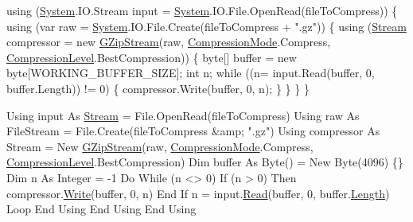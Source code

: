 \begin{DoxyCode}
\textcolor{keyword}{using} (\mbox{\hyperlink{namespace_system}{System}}.IO.Stream input = \mbox{\hyperlink{namespace_system}{System}}.IO.File.OpenRead(fileToCompress))
\{
    \textcolor{keyword}{using} (var raw = \mbox{\hyperlink{namespace_system}{System}}.IO.File.Create(fileToCompress + \textcolor{stringliteral}{".gz"}))
    \{
        \textcolor{keyword}{using} (\mbox{\hyperlink{namespace_super_tiled2_unity_1_1_ionic_1_1_zip_a9ced5352c56e7e0fceff15b534073c83aeae835e83c0494a376229f254f7d3392}{Stream}} compressor = \textcolor{keyword}{new} \mbox{\hyperlink{class_super_tiled2_unity_1_1_ionic_1_1_zlib_1_1_g_zip_stream_a509b4683754c1e03e277c5688b75cf54}{GZipStream}}(raw,
                                                  \mbox{\hyperlink{namespace_super_tiled2_unity_1_1_ionic_1_1_zlib_ad5b7635d92497e1c905e5de82eb1c6b1}{CompressionMode}}.Compress,
                                                  \mbox{\hyperlink{namespace_super_tiled2_unity_1_1_ionic_1_1_zlib_a20f6771804996c363f454ad9765cd7db}{CompressionLevel}}.BestCompression))
        \{
            byte[] buffer = \textcolor{keyword}{new} byte[WORKING\_BUFFER\_SIZE];
            \textcolor{keywordtype}{int} n;
            \textcolor{keywordflow}{while} ((n= input.Read(buffer, 0, buffer.Length)) != 0)
            \{
                compressor.Write(buffer, 0, n);
            \}
        \}
    \}
\}
\end{DoxyCode}



\begin{DoxyCode}
Using input As \mbox{\hyperlink{namespace_super_tiled2_unity_1_1_ionic_1_1_zip_a9ced5352c56e7e0fceff15b534073c83aeae835e83c0494a376229f254f7d3392}{Stream}} = File.OpenRead(fileToCompress)
    Using raw As FileStream = File.Create(fileToCompress &amp; \textcolor{stringliteral}{".gz"})
        Using compressor As Stream = New \mbox{\hyperlink{class_super_tiled2_unity_1_1_ionic_1_1_zlib_1_1_g_zip_stream_a509b4683754c1e03e277c5688b75cf54}{GZipStream}}(raw, 
      \mbox{\hyperlink{namespace_super_tiled2_unity_1_1_ionic_1_1_zlib_ad5b7635d92497e1c905e5de82eb1c6b1}{CompressionMode}}.Compress, \mbox{\hyperlink{namespace_super_tiled2_unity_1_1_ionic_1_1_zlib_a20f6771804996c363f454ad9765cd7db}{CompressionLevel}}.BestCompression)
            Dim buffer As Byte() = New Byte(4096) \{\}
            Dim n As Integer = -1
            Do While (n <> 0)
                If (n > 0) Then
                    compressor.\mbox{\hyperlink{class_super_tiled2_unity_1_1_ionic_1_1_zlib_1_1_g_zip_stream_a49032afb5806563236a5d53841abe2b8}{Write}}(buffer, 0, n)
                End If
                n = input.\mbox{\hyperlink{class_super_tiled2_unity_1_1_ionic_1_1_zlib_1_1_g_zip_stream_a772b5013a585850ffaf8be4aa7f3dbcf}{Read}}(buffer, 0, buffer.\mbox{\hyperlink{class_super_tiled2_unity_1_1_ionic_1_1_zlib_1_1_g_zip_stream_ade637ab4f778c5ee7f5540e00662a645}{Length}})
            Loop
        End Using
    End Using
End Using
\end{DoxyCode}
 


